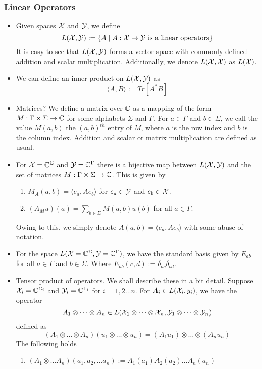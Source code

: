 \subsubsection{Linear Operators}
\begin{itemize}
    \item Given spaces $\mathcal{X}$ and $\mathcal{Y}$, we define 
    \[L(\mathcal{X},\mathcal{Y}):= \{A\mid A:\mathcal{X}\to\mathcal{Y} \text{ is a linear operators}\}\]
    It is easy to see that $L(\mathcal{X},\mathcal{Y})$ forms a vector space with commonly defined addition and scalar multiplication. Additionally, we denote $L(\mathcal{X},\mathcal{X})$ as $L(\mathcal{X})$.
    \item We can define an inner product on $L(\mathcal{X},\mathcal{Y})$ as
    \[\langle A,B\rangle := Tr[A^*B]\]
    \item Matrices? We define a matrix over $\mathbb{C}$ as a mapping of the form
    $M : \Gamma\times\Sigma\to\mathbb{C}$
    for some alphabets $\Sigma$ and $\Gamma$. For $a \in \Gamma$ and $b\in\Sigma$, we call the value $M(a,b)$ the $(a,b)^{th}$ entry of $M$, where $a$ is the row index and $b$ is the column index. Addition and scalar or matrix multiplication are defined as usual. 
    \item For $\mathcal{X}= \mathbb{C}^{\Sigma}$ and $\mathcal{Y} = \mathbb{C}^{\Gamma}$ there is a bijective map between $L(\mathcal{X},\mathcal{Y})$ and the set of matrices $M:\Gamma\times\Sigma\to\mathbb{C}$. This is given by 
    \begin{enumerate}
        \item $M_A(a,b) = \langle e_a,Ae_b\rangle$ for $e_a\in\mathcal{Y}$ and $e_b\in\mathcal{X}$.
        \item $(A_Mu)(a) = \sum_{b\in\Sigma}M(a,b)u(b)$ for all $a\in\Gamma$.
    \end{enumerate}
    Owing to this, we simply denote $A(a,b) = \langle e_a,Ae_b\rangle$ with some abuse of notation.
    \item For the space $L(\mathcal{X} = \mathbb{C}^{\Sigma},\mathcal{Y} = \mathbb{C}^{\Gamma})$, we have the standard basis given by $E_{ab}$ for all $a\in\Gamma$ and $b\in\Sigma$. Where $E_{ab}(c,d) := \delta_{ac}\delta_{bd}$.
    \item Tensor product of operators. We shall describe these in a bit detail. Suppose $\mathcal{X}_i = \mathbb{C}^{\Sigma_i}$ and $\mathcal{Y}_i = \mathbb{C}^{\Gamma_i}$ for $i = 1,2\dots n$. For $A_i\in L(\mathcal{X}_i,y_i)$, we have the operator
    \[A_1\otimes\dots\otimes A_n\in L(\mathcal{X}_1\otimes\dots\otimes\mathcal{X}_n,\mathcal{Y}_1\otimes\dots\otimes\mathcal{Y}_n)\]
    defined as
    \[(A_1\otimes\dots\otimes A_n)(u_1\otimes\dots\otimes u_n) = (A_1u_1)\otimes\dots\otimes(A_nu_n)\]
    The following holds
    \begin{enumerate}
        \item $(A_1\otimes\dots A_n)(a_1,a_2,\dots a_n) := A_1(a_1)A_2(a_2)\dots A_n(a_n)$

\end{enumerate}
\end{itemize}
